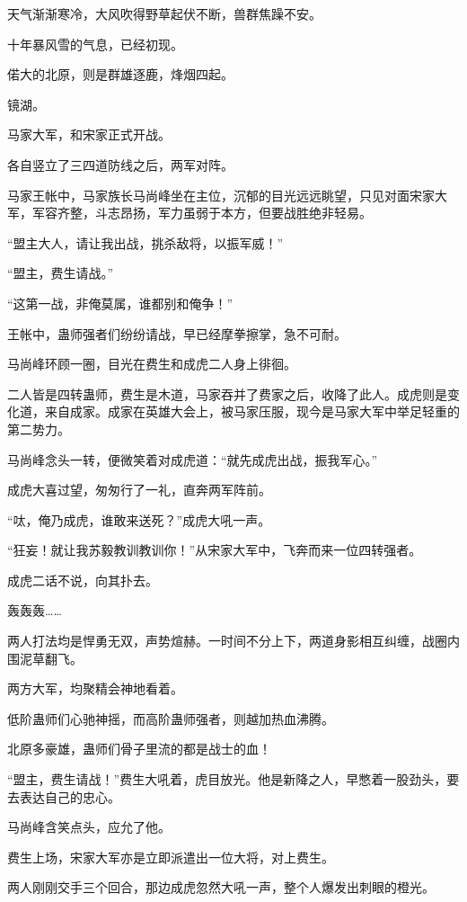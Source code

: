 
\begin{this_body}

天气渐渐寒冷，大风吹得野草起伏不断，兽群焦躁不安。

十年暴风雪的气息，已经初现。

偌大的北原，则是群雄逐鹿，烽烟四起。

镜湖。

马家大军，和宋家正式开战。

各自竖立了三四道防线之后，两军对阵。

马家王帐中，马家族长马尚峰坐在主位，沉郁的目光远远眺望，只见对面宋家大军，军容齐整，斗志昂扬，军力虽弱于本方，但要战胜绝非轻易。

“盟主大人，请让我出战，挑杀敌将，以振军威！”

“盟主，费生请战。”

“这第一战，非俺莫属，谁都别和俺争！”

王帐中，蛊师强者们纷纷请战，早已经摩拳擦掌，急不可耐。

马尚峰环顾一圈，目光在费生和成虎二人身上徘徊。

二人皆是四转蛊师，费生是木道，马家吞并了费家之后，收降了此人。成虎则是变化道，来自成家。成家在英雄大会上，被马家压服，现今是马家大军中举足轻重的第二势力。

马尚峰念头一转，便微笑着对成虎道：“就先成虎出战，振我军心。”

成虎大喜过望，匆匆行了一礼，直奔两军阵前。

“呔，俺乃成虎，谁敢来送死？”成虎大吼一声。

“狂妄！就让我苏毅教训教训你！”从宋家大军中，飞奔而来一位四转强者。

成虎二话不说，向其扑去。

轰轰轰……

两人打法均是悍勇无双，声势煊赫。一时间不分上下，两道身影相互纠缠，战圈内围泥草翻飞。

两方大军，均聚精会神地看着。

低阶蛊师们心驰神摇，而高阶蛊师强者，则越加热血沸腾。

北原多豪雄，蛊师们骨子里流的都是战士的血！

“盟主，费生请战！”费生大吼着，虎目放光。他是新降之人，早憋着一股劲头，要去表达自己的忠心。

马尚峰含笑点头，应允了他。

费生上场，宋家大军亦是立即派遣出一位大将，对上费生。

两人刚刚交手三个回合，那边成虎忽然大吼一声，整个人爆发出刺眼的橙光。


\end{this_body}
